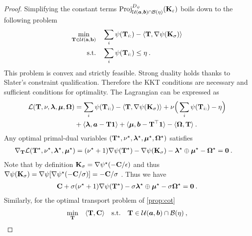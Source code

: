 \begin{proof}    
    Simplifying the constant terms $\operatorname{Proj}^{D_\psi}_{{\mathcal{U}}(\bm{a}, \bm{b}) \cap \mathcal{B}(\eta)}({\mathbf{K}}_\varepsilon)$ boils down to the following problem
    \begin{align}
        \min_{{\mathbf{T}} \in {\mathcal{U}}({\mathbf{a}}, {\mathbf{b}})} \quad &\sum_i \psi({\mathbf{T}}_{i:}) - \langle {\mathbf{T}}, \nabla \psi({\mathbf{K}}_\sigma) \rangle \\
        \text{s.t.} \quad &\sum_i \psi({\mathbf{T}}_{i:}) \leq \eta \:.
    \end{align}
    This problem is convex and strictly feasible. Strong duality holds thanks to Slater's constraint qualification. Therefore the KKT conditions \citep{boyd2004convex} are necessary and sufficient conditions for optimality.
    The Lagrangian can be expressed as
    \begin{align}
        \mathcal{L}({\mathbf{T}}, \nu, \bm{\lambda}, \bm{\mu}, \mathbf{\Omega}) &= \sum_i \psi({\mathbf{T}}_{i:}) - \langle {\mathbf{T}}, \nabla \psi({\mathbf{K}}_\sigma) \rangle + \nu\Big(\sum_i \psi({\mathbf{T}}_{i:}) - \eta \Big) \\
        &+ \langle \bm{\lambda}, \bm{a} - {\mathbf{T}} \bm{1} \rangle + \langle \bm{\mu}, \bm{b} - {\mathbf{T}}^\top \bm{1} \rangle - \langle \mathbf{\Omega}, {\mathbf{T}} \rangle \:.
    \end{align}
    Any optimal primal-dual variables $({\mathbf{T}}^\star, \nu^\star, \bm{\lambda}^\star, \bm{\mu}^\star, \mathbf{\Omega}^\star)$ satisfies
    \begin{align}
            \nabla_{{\mathbf{T}}} \mathcal{L}({\mathbf{T}}^\star,  \nu^\star, \bm{\lambda}^\star, \bm{\mu}^\star) &=  (\nu^\star + 1) \nabla \psi({\mathbf{T}}^\star) - \nabla \psi({\mathbf{K}}_\sigma) - \bm{\lambda}^\star \oplus \bm{\mu}^\star - \mathbf{\Omega}^\star = \bm{0} \:.
    \end{align}
    Note that by definition ${\mathbf{K}}_\sigma = \nabla \psi^\star(-{\mathbf{C}}/\epsilon)$ and thus $\nabla \psi({\mathbf{K}}_\sigma) = \nabla \psi[\nabla \psi^\star(-{\mathbf{C}}/\sigma)] = -{\mathbf{C}} / \sigma$ \citep{rockafellar1997convex}. Thus we have 
    \begin{align}
        {\mathbf{C}} + \sigma (\nu^\star + 1) \nabla \psi({\mathbf{T}}^\star) -  \sigma \bm{\lambda}^\star \oplus \bm{\mu}^\star - \sigma \mathbf{\Omega}^\star= \bm{0} \:.
    \end{align}
    Similarly, for the optimal transport problem of \eqref{prop:cot}
    \begin{align}
        \min_{\mT} \quad \langle \mT, \mC \rangle \quad \text{s.t.} \quad  \mT \in \gU(\bm{a}, \bm{b}) \cap \mathcal{B}(\eta) \:,

\end{align}
\end{proof}
